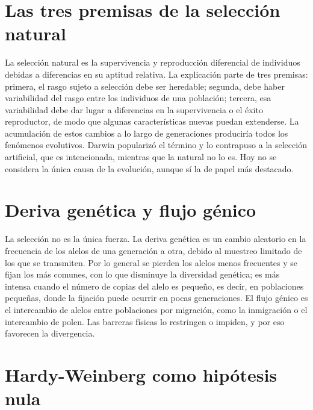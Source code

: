 \documentclass{book}
\begin{document}

\section{Las tres premisas de la selección natural}

La selección natural es la supervivencia y reproducción diferencial de individuos debidas a diferencias en su aptitud relativa. La explicación parte de tres premisas: primera, el rasgo sujeto a selección debe ser heredable; segunda, debe haber variabilidad del rasgo entre los individuos de una población; tercera, esa variabilidad debe dar lugar a diferencias en la supervivencia o el éxito reproductor, de modo que algunas características nuevas puedan extenderse. La acumulación de estos cambios a lo largo de generaciones produciría todos los fenómenos evolutivos. Darwin popularizó el término y lo contrapuso a la selección artificial, que es intencionada, mientras que la natural no lo es. Hoy no se considera la única causa de la evolución, aunque sí la de papel más destacado.


\section{Deriva genética y flujo génico}

La selección no es la única fuerza. La deriva genética es un cambio aleatorio en la frecuencia de los alelos de una generación a otra, debido al muestreo limitado de los que se transmiten. Por lo general se pierden los alelos menos frecuentes y se fijan los más comunes, con lo que disminuye la diversidad genética; es más intensa cuando el número de copias del alelo es pequeño, es decir, en poblaciones pequeñas, donde la fijación puede ocurrir en pocas generaciones. El flujo génico es el intercambio de alelos entre poblaciones por migración, como la inmigración o el intercambio de polen. Las barreras físicas lo restringen o impiden, y por eso favorecen la divergencia.


\section{Hardy-Weinberg como hipótesis nula}
\end{document}
